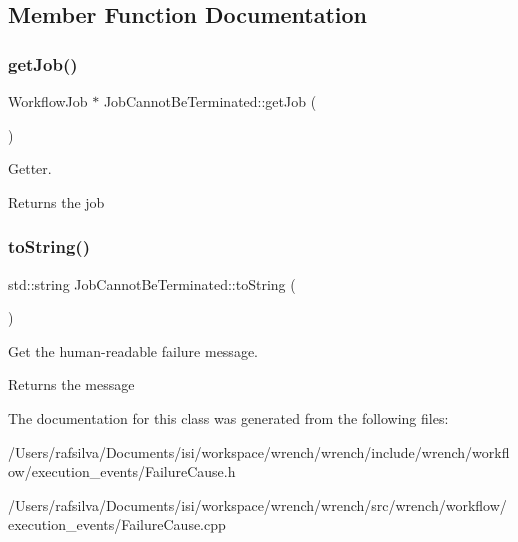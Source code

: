 \subsection{Member Function Documentation}
\mbox{\label{class_job_cannot_be_terminated_a700ef0cdfff8ac9ef5fbf05b23eb5330}} 
\subsubsection{\texorpdfstring{get\+Job()}{getJob()}}
{\footnotesize\ttfamily Workflow\+Job $\ast$ Job\+Cannot\+Be\+Terminated\+::get\+Job (\begin{DoxyParamCaption}{ }\end{DoxyParamCaption})}



Getter. 

\begin{DoxyReturn}{Returns}
the job 
\end{DoxyReturn}
\mbox{\label{class_job_cannot_be_terminated_a25157a936fc9676aac686d4063f95082}} 
\subsubsection{\texorpdfstring{to\+String()}{toString()}}
{\footnotesize\ttfamily std\+::string Job\+Cannot\+Be\+Terminated\+::to\+String (\begin{DoxyParamCaption}{ }\end{DoxyParamCaption})}



Get the human-\/readable failure message. 

\begin{DoxyReturn}{Returns}
the message 
\end{DoxyReturn}


The documentation for this class was generated from the following files\+:\begin{DoxyCompactItemize}
\item 
/\+Users/rafsilva/\+Documents/isi/workspace/wrench/wrench/include/wrench/workflow/execution\+\_\+events/Failure\+Cause.\+h\item 
/\+Users/rafsilva/\+Documents/isi/workspace/wrench/wrench/src/wrench/workflow/execution\+\_\+events/Failure\+Cause.\+cpp\end{DoxyCompactItemize}
